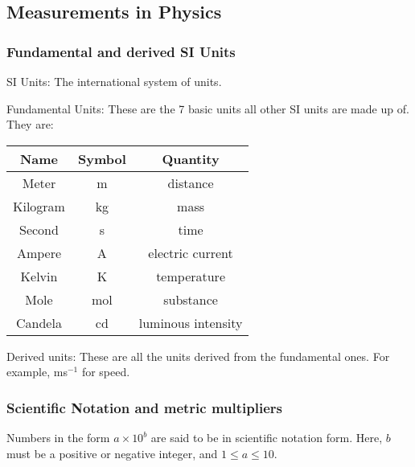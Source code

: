 \subsection{Measurements in Physics}

\subsubsection{Fundamental and derived SI Units}

SI Units: The international system of units.

Fundamental Units: These are the 7 basic units all other SI units are made up
of. They are:
\begin{center}
    \begin{tabular}{ |c|c|c| }
        \hline
        \textbf{Name} & \textbf{Symbol} & \textbf{Quantity} \\
        \hline
        Meter         & m               & distance \\
        Kilogram      & kg              & mass \\
        Second        & s               & time \\
        Ampere        & A               & electric current \\
        Kelvin        & K               & temperature \\
        Mole          & mol             & substance \\
        Candela       & cd              & luminous intensity \\
        \hline
    \end{tabular}
\end{center}

Derived units: These are all the units derived from the fundamental ones. For
example, ms$^{-1}$ for speed.

\subsubsection{Scientific Notation and metric multipliers}

Numbers in the form $a \times 10^b$ are said to be in scientific notation form.
Here, $b$ must be a positive or negative integer, and $1 \leq a \leq 10$.

